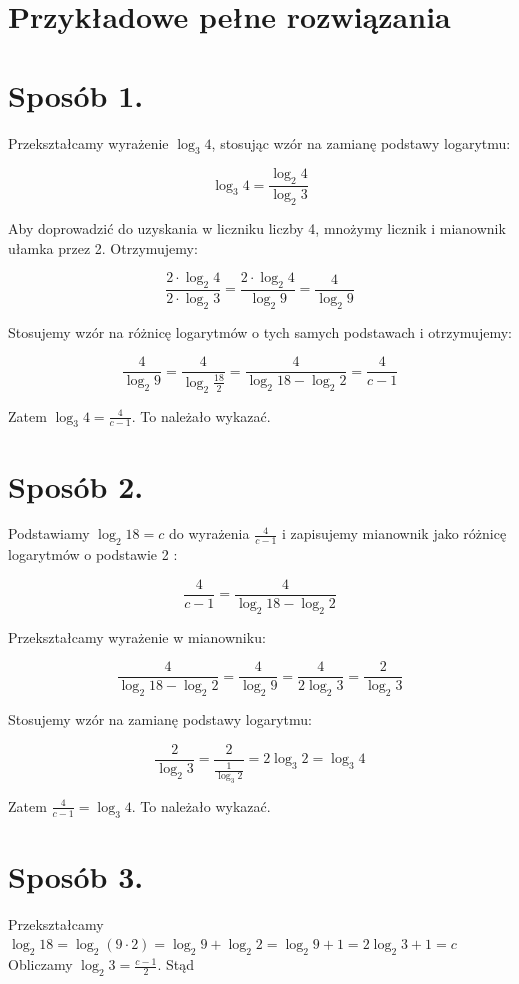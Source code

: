 \documentclass[10pt]{article}
\begin{document}
\section*{Przykładowe pełne rozwiązania}
\section*{Sposób 1.}
Przekształcamy wyrażenie $\log _{3} 4$, stosując wzór na zamianę podstawy logarytmu:

$$
\log _{3} 4=\frac{\log _{2} 4}{\log _{2} 3}
$$

Aby doprowadzić do uzyskania w liczniku liczby 4, mnożymy licznik i mianownik ułamka przez 2. Otrzymujemy:

$$
\frac{2 \cdot \log _{2} 4}{2 \cdot \log _{2} 3}=\frac{2 \cdot \log _{2} 4}{\log _{2} 9}=\frac{4}{\log _{2} 9}
$$

Stosujemy wzór na różnicę logarytmów o tych samych podstawach i otrzymujemy:

$$
\frac{4}{\log _{2} 9}=\frac{4}{\log _{2} \frac{18}{2}}=\frac{4}{\log _{2} 18-\log _{2} 2}=\frac{4}{c-1}
$$

Zatem $\log _{3} 4=\frac{4}{c-1}$. To należało wykazać.

\section*{Sposób 2.}
Podstawiamy $\log _{2} 18=c$ do wyrażenia $\frac{4}{c-1}$ i zapisujemy mianownik jako różnicę logarytmów o podstawie 2 :

$$
\frac{4}{c-1}=\frac{4}{\log _{2} 18-\log _{2} 2}
$$

Przekształcamy wyrażenie w mianowniku:

$$
\frac{4}{\log _{2} 18-\log _{2} 2}=\frac{4}{\log _{2} 9}=\frac{4}{2 \log _{2} 3}=\frac{2}{\log _{2} 3}
$$

Stosujemy wzór na zamianę podstawy logarytmu:

$$
\frac{2}{\log _{2} 3}=\frac{2}{\frac{1}{\log _{3} 2}}=2 \log _{3} 2=\log _{3} 4
$$

Zatem $\frac{4}{c-1}=\log _{3} 4$. To należało wykazać.

\section*{Sposób 3.}
Przekształcamy $\log _{2} 18=\log _{2}(9 \cdot 2)=\log _{2} 9+\log _{2} 2=\log _{2} 9+1=2 \log _{2} 3+1=c$\\
Obliczamy $\log _{2} 3=\frac{c-1}{2}$. Stąd
\end{document}
